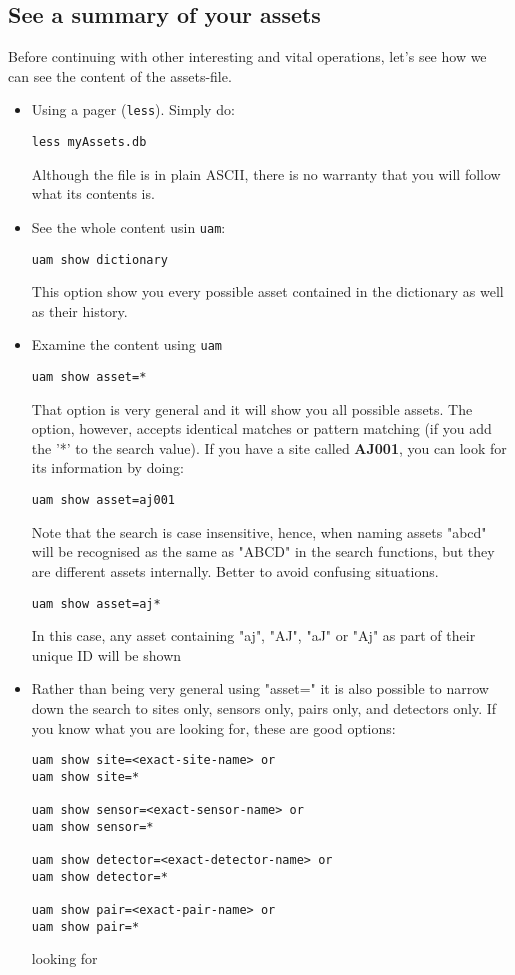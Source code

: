 \documentclass[12pt]{amsart}
\begin{document}
\subsection{See a summary of your assets}

Before continuing with other interesting and vital operations, let's see
how we can see the content of the assets-file.

\begin{itemize}
\item Using a pager ({\tt less}). Simply do:

{\tt less myAssets.db}

Although the file is in plain ASCII, there is no warranty that you will
follow what its contents is.

\item See the whole content usin {\tt uam}:

{\tt uam show dictionary}

This option show you every possible asset contained in the dictionary as
well as their history.

\item Examine the content using {\tt uam}

{\tt uam show asset=*}

That option is very general and it will show you all possible assets. The
option, however, accepts identical matches or pattern matching (if you add
the '*' to the search value). If you have a site called {\bf AJ001}, you
can look for its information by doing:

{\tt uam show asset=aj001}

Note that the search is case insensitive, hence, when naming assets
"abcd" will be recognised as the same as "ABCD" in the search functions,
but they are different assets internally. Better to avoid confusing
situations.

{\tt uam show asset=aj*}

In this case, any asset containing "aj", "AJ", "aJ" or "Aj" as part of
their unique ID will be shown

\item Rather than being very general using "asset=" it is also possible to
narrow down the search to sites only, sensors only, pairs only, and
detectors only.  If you know what you are looking for, these are good
options:

\begin{verbatim}
uam show site=<exact-site-name> or
uam show site=*

uam show sensor=<exact-sensor-name> or
uam show sensor=*

uam show detector=<exact-detector-name> or
uam show detector=*

uam show pair=<exact-pair-name> or
uam show pair=*

\end{verbatim}
looking for
\end{itemize}
\end{document}
